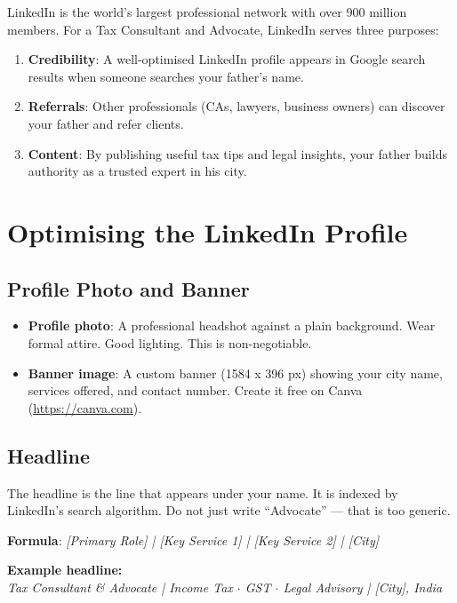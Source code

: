 \documentclass[12pt, a4paper]{book}
\begin{document}
LinkedIn is the world's largest professional network with over 900 million members.
For a Tax Consultant and Advocate, LinkedIn serves three purposes:

\begin{enumerate}[leftmargin=1.5em]
  \item \textbf{Credibility}: A well-optimised LinkedIn profile appears in Google
        search results when someone searches your father's name.
  \item \textbf{Referrals}: Other professionals (CAs, lawyers, business owners)
        can discover your father and refer clients.
  \item \textbf{Content}: By publishing useful tax tips and legal insights,
        your father builds authority as a trusted expert in his city.
\end{enumerate}

\section{Optimising the LinkedIn Profile}

\subsection{Profile Photo and Banner}

\begin{itemize}[leftmargin=1.5em]
  \item \textbf{Profile photo}: A professional headshot against a plain background.
        Wear formal attire. Good lighting. This is non-negotiable.
  \item \textbf{Banner image}: A custom banner (1584 x 396 px) showing your city name,
        services offered, and contact number. Create it free on Canva (\url{https://canva.com}).
\end{itemize}

\subsection{Headline}

The headline is the line that appears under your name. It is indexed by LinkedIn's
search algorithm. Do not just write ``Advocate'' --- that is too generic.

\textbf{Formula}: \emph{[Primary Role] | [Key Service 1] | [Key Service 2] | [City]}

\begin{tcolorbox}[notebox]
\textbf{Example headline:}\\
\textit{Tax Consultant \& Advocate | Income Tax $\cdot$ GST $\cdot$ Legal Advisory | [City], India}
\end{tcolorbox}
\end{document}
